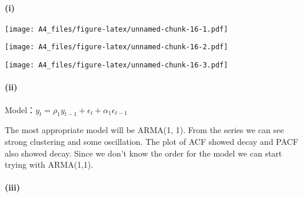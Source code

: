 \documentclass[]{article}
\newenvironment{Shaded}{\begin{snugshade}}{\end{snugshade}}
\newcommand{\DataTypeTok}[1]{\textcolor[rgb]{0.13,0.29,0.53}{#1}}
\newcommand{\KeywordTok}[1]{\textcolor[rgb]{0.13,0.29,0.53}{\textbf{#1}}}
\newcommand{\NormalTok}[1]{#1}
\newcommand{\OperatorTok}[1]{\textcolor[rgb]{0.81,0.36,0.00}{\textbf{#1}}}
\newcommand{\StringTok}[1]{\textcolor[rgb]{0.31,0.60,0.02}{#1}}
\let\oldparagraph\paragraph
\renewcommand{\paragraph}[1]{\oldparagraph{#1}\mbox{}}
\begin{document}
\hypertarget{i-4}{%
\paragraph{(i)}\label{i-4}}

\begin{Shaded}
\end{Shaded}

\texttt{[image: A4\_files/figure-latex/unnamed-chunk-16-1.pdf]}

\begin{Shaded}
\end{Shaded}

\texttt{[image: A4\_files/figure-latex/unnamed-chunk-16-2.pdf]}

\begin{Shaded}
\end{Shaded}

\texttt{[image: A4\_files/figure-latex/unnamed-chunk-16-3.pdf]}

\hypertarget{ii-4}{%
\paragraph{(ii)}\label{ii-4}}

Model：\(y_t = \rho_1y_{t-1} + \epsilon_t+ \alpha_1\epsilon_{t-1}\)

The most appropriate model will be ARMA(1, 1). From the series we can
see strong clustering and some oscillation. The plot of ACF showed decay
and PACF also showed decay. Since we don't know the order for the model
we can start trying with ARMA(1,1).

\hypertarget{iii-4}{%
\paragraph{(iii)}\label{iii-4}}
\end{document}
